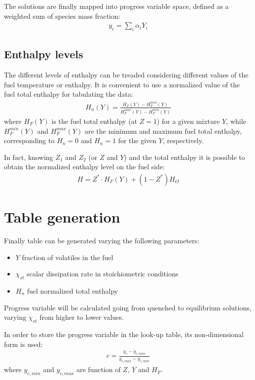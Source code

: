 \documentclass[]{scrartcl}
\begin{document}
The solutions are finally mapped into progress variable space, defined as a weighted sum of species mass fraction:
\begin{eqnarray}
y_c = \sum_i \alpha_i Y_i
\end{eqnarray}

\subsection{Enthalpy levels}
The different levels of enthalpy can be treaded considering different values of the fuel temperature or enthalpy.
It is convenient to use a normalized value of the fuel total enthalpy for tabulating the data:
\begin{eqnarray}
H_n(Y) = \frac{H_F(Y) - H_F^{min}(Y)}{H_F^{max}(Y) - H_F^{min}(Y)}
\end{eqnarray}
where $H_F(Y)$ is the fuel total enthalpy (at $Z=1$) for a given mixture $Y$, while $H_F^{min}(Y)$ and $H_F^{max}(Y)$ are the minimum and maximum fuel total enthalpy, corresponding to $H_n=0$ and $H_n=1$ for the given $Y$, respectively.

In fact, knowing $Z_1$ and $Z_2$ (or $Z$ and $Y$) and the total enthalpy it is possible to obtain the normalized enthalpy level on the fuel side:
\begin{eqnarray}
H = Z^*\cdot H_F(Y) + (1-Z^*) H_O
\end{eqnarray}

\section{Table generation}
Finally table can be generated varying the following parameters:
\begin{itemize}
\item $Y$ fraction of volatiles in the fuel
\item $\chi_{st}$ scalar dissipation rate in stoichiometric conditions
\item $H_n$ fuel normalized total enthalpy
\end{itemize}
Progress variable will be calculated going from quenched to equilibrium solutions, varying $\chi_{st}$ from higher to lower values.

In order to store the progress variable in the look-up table, its non-dimensional form is used:
\begin{eqnarray}
c = \frac{y_c - y_{c, min}}{y_{c, max} - y_{c, min}}
\end{eqnarray}
where $y_{c, min}$ and $ y_{c, max}$ are function of $Z$, $Y$ and $H_F$.
\end{document}
